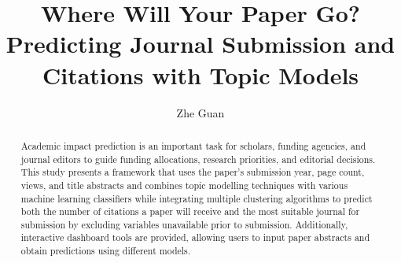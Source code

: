 \documentclass[9pt,twocolumn,twoside]{pnas-new}
\begin{document}
\title{Where Will Your Paper Go? Predicting Journal Submission and Citations with Topic Models}

\author[a,1]{Zhe Guan}






\begin{abstract}

Academic impact prediction is an important task for scholars, funding agencies, and journal editors to guide funding allocations, research priorities, and editorial decisions. This study presents a framework that uses the paper’s submission year, page count, views, and title abstracts and combines topic modelling techniques with various machine learning classifiers while integrating multiple clustering algorithms to predict both the number of citations a paper will receive and the most suitable journal for submission by excluding variables unavailable prior to submission. Additionally, interactive dashboard tools are provided, allowing users to input paper abstracts and obtain predictions using different models.


\end{abstract}
\end{document}
